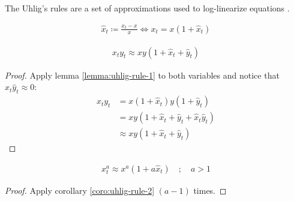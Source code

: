 \documentclass[../thesis.tex]{subfiles}
\begin{document}

\begin{definition}\label{def:uhligs-rules}
	The Uhlig's rules are a set of approximations used to log-linearize equations \cite[Lecture 6, p.2]{solis-garcia_ucb_2022}.
\end{definition}


\begin{lemma}\label{lemma:uhlig-rule-1}
	\begin{align*}
	\hat{x}_t \coloneqq \frac{x_t - x}{x} \iff x_t = x(1 + \hat{x}_t)
	\end{align*}
\end{lemma}


\begin{corollary}\label{coro:uhlig-rule-2}
	\begin{align*}
		x_t y_t \approx xy(1 + \hat{x}_t + \hat{y}_t) 
	\end{align*}	
	\begin{proof} Apply lemma \ref{lemma:uhlig-rule-1} to both variables and notice that $\hat{x}_t\hat{y}_t \approx 0$:
		\begin{align*}
			x_t y_t	&= x(1 + \hat{x}_t)y(1 + \hat{y}_t) \\
			&= xy(1 + \hat{x}_t + \hat{y}_t + \hat{x}_t\hat{y}_t) \\
			&\approx xy(1 + \hat{x}_t + \hat{y}_t) 
		\end{align*}
	\end{proof}
\end{corollary}
		

\begin{corollary}\label{uhlig-rule-3}
	\begin{align*}
		x_{t}^{a} \approx x^a(1 + a\hat{x}_t) \quad ; \quad a>1 
	\end{align*}	
	\begin{proof} Apply corollary \ref{coro:uhlig-rule-2} $(a-1)$ times. \end{proof}
\end{corollary}
\end{document}
